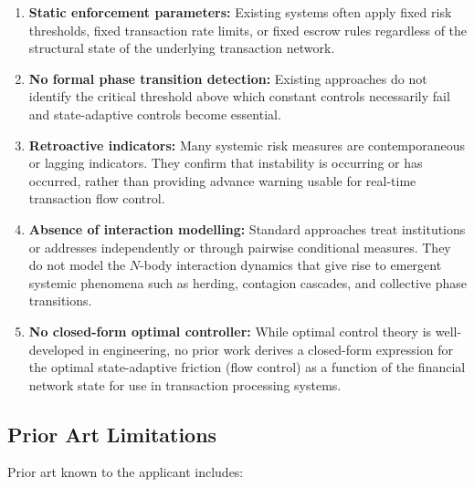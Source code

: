 \documentclass[12pt,a4paper]{article}
\begin{document}
\begin{enumerate}[label=(\alph*)]
\item \textbf{Static enforcement parameters:} Existing systems often apply 
fixed risk thresholds, fixed transaction rate limits, or fixed escrow rules 
regardless of the structural state of the underlying transaction network.

\item \textbf{No formal phase transition detection:} Existing approaches 
do not identify the critical threshold above which constant controls 
necessarily fail and state-adaptive controls become essential.

\item \textbf{Retroactive indicators:} Many systemic risk measures are 
contemporaneous or lagging indicators. They confirm that instability is 
occurring or has occurred, rather than providing advance warning usable for 
real-time transaction flow control.

\item \textbf{Absence of interaction modelling:} Standard approaches 
treat institutions or addresses independently or through pairwise 
conditional measures. They do not model the $N$-body interaction dynamics 
that give rise to emergent systemic phenomena such as herding, contagion 
cascades, and collective phase transitions.

\item \textbf{No closed-form optimal controller:} While optimal control 
theory is well-developed in engineering, no prior work derives a closed-form 
expression for the optimal state-adaptive friction (flow control) as a 
function of the financial network state for use in transaction processing 
systems.
\end{enumerate}

\subsection{Prior Art Limitations}

Prior art known to the applicant includes:
\end{document}
